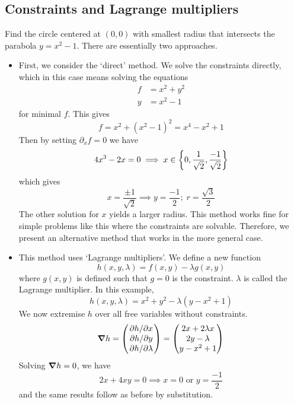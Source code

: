 \subsection{Constraints and Lagrange multipliers}
\begin{example}
	Find the circle centered at \((0, 0)\) with smallest radius that intersects the parabola \(y = x^2 - 1\).
	There are essentially two approaches.
	\begin{itemize}
		\item First, we consider the `direct' method.
		      We solve the constraints directly, which in this case means solving the equations
		      \begin{align*}
			      f & = x^2 + y^2 \\
			      y & = x^2 - 1
		      \end{align*}
		      for minimal \(f\).
		      This gives
		      \[
			      f = x^2 + (x^2 - 1)^2 = x^4 - x^2 + 1
		      \]
		      Then by setting \(\partial_x f = 0\) we have
		      \[
			      4x^3 - 2x = 0 \implies x \in \qty{0, \frac{1}{\sqrt 2}, \frac{-1}{\sqrt 2}}
		      \]
		      which gives
		      \[
			      x = \frac{\pm 1}{\sqrt{2}} \implies y = \frac{-1}{2};\; r = \frac{\sqrt{3}}{2}
		      \]
		      The other solution for \(x\) yields a larger radius.
		      This method works fine for simple problems like this where the constraints are solvable.
		      Therefore, we present an alternative method that works in the more general case.
		\item This method uses `Lagrange multipliers'.
		      We define a new function
		      \[
			      h(x, y, \lambda) = f(x, y) - \lambda g(x, y)
		      \]
		      where \(g(x, y)\) is defined such that \(g = 0\) is the constraint.
		      \(\lambda\) is called the Lagrange multiplier.
		      In this example,
		      \[
			      h(x, y, \lambda) = x^2 + y^2 - \lambda (y - x^2 + 1)
		      \]
		      We now extremise \(h\) over all free variables without constraints.
		      \[
			      \grad{h} = \begin{pmatrix}
				      \pdv*{h}{x} \\ \pdv*{h}{y} \\ \pdv*{h}{\lambda}
			      \end{pmatrix} = \begin{pmatrix}
				      2x + 2\lambda x \\
				      2y - \lambda    \\
				      y - x^2 + 1
			      \end{pmatrix}
		      \]
		      Solving \(\grad{h} = 0\), we have
		      \[
			      2x + 4xy = 0 \implies x = 0 \text{ or } y = \frac{-1}{2}
		      \]
		      and the same results follow as before by substitution.
	\end{itemize}
\end{example}


